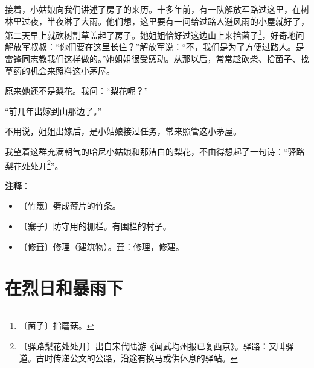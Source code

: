 \documentclass[12pt,UTF-8,openany]{ctexbook}
\begin{document}
\begin{large}
    接着，小姑娘向我们讲述了房子的来历。十多年前，有一队解放军路过这里，在树林里过夜，半夜淋了大雨。他们想，这里要有一间给过路人避风雨的小屋就好了，第二天早上就砍树割草盖起了房子。她姐姐恰好过这边山上来拾菌子\footnote{〔菌子〕指蘑菇。}，好奇地问解放军叔叔：“你们要在这里长住？”解放军说：“不，我们是为了方便过路人。是雷锋同志教我们这样做的。”她姐姐很受感动。从那以后，常常趁砍柴、拾菌子、找草药的机会来照料这小茅屋。
    
    原来她还不是梨花。我问：“梨花呢？”
    
    “前几年出嫁到山那边了。”
    
    不用说，姐姐出嫁后，是小姑娘接过任务，常来照管这小茅屋。
    
    我望着这群充满朝气的哈尼小姑娘和那洁白的梨花，不由得想起了一句诗：“驿路梨花处处开\footnote{〔驿路梨花处处开〕出自宋代陆游《闻武均州报已复西京》。驿路：又叫驿道。古时传递公文的公路，沿途有换马或供休息的驿站。}”。
    
\end{large}


\newpage

\textbf{注释}：

\vspace{-1em}

\begin{itemize}
    \setlength\itemsep{-0.2em}
    \item 〔竹篾〕劈成薄片的竹条。
    \item 〔寨子〕防守用的栅栏。有围栏的村子。
    \item 〔修葺〕修理（建筑物）。葺：修理，修建。
\end{itemize}

\chapter{在烈日和暴雨下}
\end{document}

